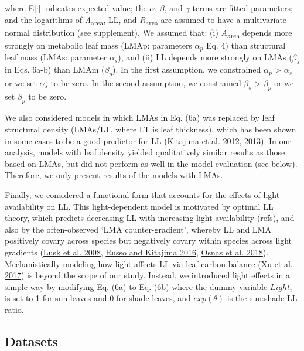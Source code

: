 \documentclass[
  12pt,
]{article}
\begin{document}
where E{[}\(\cdot\){]} indicates expected value;
the \(\alpha\), \(\beta\), and \(\gamma\) terms are fitted parameters;
and the logarithms of \emph{A}\textsubscript{area}, LL, and \emph{R}\textsubscript{area} are assumed to have a multivariate normal distribution (see supplement).
We assumed that:
(i) \emph{A}\textsubscript{area} depends more strongly on metabolic leaf mass (LMAp: parameters \(\alpha_p\) Eq. 4) than structural leaf mass (LMAs: parameter \(\alpha_s\)), and
(ii) LL depends more strongly on LMAs (\(\beta_s\) in Eqs. 6a-b) than LMAm (\(\beta_p\)).
In the first assumption, we constrained \(\alpha_p\) \textgreater{} \(\alpha_s\) or we set \(\alpha_s\) to be zero.
In the second assumption, we constrained \(\beta_s\) \textgreater{} \(\beta_p\) or we set \(\beta_p\) to be zero.

We also considered models in which LMAs in Eq. (6a) was replaced by leaf structural density (LMAs/LT, where LT is leaf thickness), which has been shown in some cases to be a good predictor for LL (\protect\hyperlink{ref-Kitajima2012}{Kitajima et al. 2012}, \protect\hyperlink{ref-Kitajima2013}{2013}).
In our analysis, models with leaf density yielded qualitatively similar results as those based on LMAs, but did not perform as well in the model evaluation (see below).
Therefore, we only present results of the models with LMAs.

Finally, we considered a functional form that accounts for the effects of light availability on LL.
This light-dependent model is motivated by optimal LL theory, which predicts decreasing LL with increasing light availability (refs), and also by the often-observed `LMA counter-gradient', whereby LL and LMA positively covary across species but negatively covary within species across light gradients (\protect\hyperlink{ref-Lusk2008}{Lusk et al. 2008}, \protect\hyperlink{ref-Russo2016}{Russo and Kitajima 2016}, \protect\hyperlink{ref-Osnas2018}{Osnas et al. 2018}).
Mechanistically modeling how light affects LL via leaf carbon balance (\protect\hyperlink{ref-Xu2017}{Xu et al. 2017}) is beyond the scope of our study.
Instead, we introduced light effects in a simple way by modifying Eq. (6a) to Eq. (6b) where the dummy variable \(Light_i\) is set to 1 for sun leaves and 0 for shade leaves, and \(exp(\theta)\) is the sun:shade LL ratio.

\hypertarget{datasets}{%
\subsection{Datasets}\label{datasets}}
\end{document}
